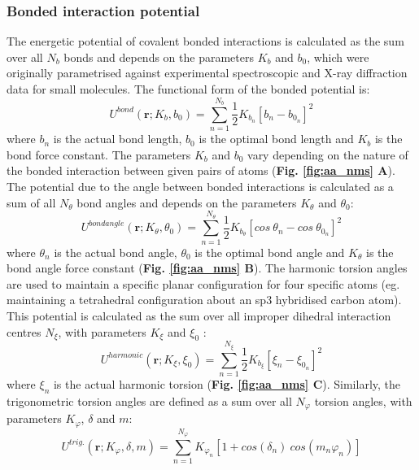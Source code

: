 \subsubsection{Bonded interaction potential}
The energetic potential of covalent bonded interactions is calculated as the sum over all $N_{b}$ bonds and depends on the parameters $K_{b}$ and $b_{0}$, which were originally parametrised against experimental spectroscopic and X-ray diffraction data for small molecules. The functional form of the bonded potential is:
%
%
\begin{equation}
U^{bond}(\mathbf{r}; K_{b}, b_{0}) = \sum_{n=1}^{N_{b}} \frac{1}{2} K_{b_{n}} \left[ b_{n} - b_{0_{n}} \right] ^{2}
\end{equation}
%
%
where $b_{n}$ is the actual bond length, $b_{0}$ is the optimal bond length and $K_{b}$ is the bond force constant. The parameters $K_{b}$ and $b_{0}$ vary depending on the nature of the bonded interaction between given pairs of atoms (\textbf{Fig. \ref{fig:aa_nms} A}). The potential due to the angle between bonded interactions is calculated as a sum of all $N_{\theta}$ bond angles and depends on the parameters $K_{\theta}$ and $\theta_{0}$:
%
%
\begin{equation}
U^{bond angle}(\mathbf{r}; K_{\theta},\theta_{0}) = \sum_{n=1}^{N_{\theta}} \frac{1}{2} K_{b_{\theta}} \left[ cos \: \theta_{n} - cos \: \theta_{0_{n}} \right] ^{2}
\end{equation}
%
%
where $\theta_{n}$ is the actual bond angle, $\theta_{0}$ is the optimal bond angle and $K_{\theta}$ is the bond angle force constant (\textbf{Fig. \ref{fig:aa_nms} B}). The harmonic torsion angles are used to maintain a specific planar configuration for four specific atoms (eg. maintaining a tetrahedral configuration about an sp3 hybridised carbon atom). This potential is calculated as the sum over all improper dihedral interaction centres $N_{\xi}$, with parameters $K_{\xi}$ and $\xi_{0}$ \cite{Oostenbrink:2004aa}:
%
%
\begin{equation}
U^{harmonic}(\mathbf{r}; K_{\xi}, \xi_{0}) = \sum_{n=1}^{N_{\xi}} \frac{1}{2} K_{b_{\xi}} \left[ \xi_{n} - \xi_{0_{n}} \right] ^{2}
\end{equation}
%
%
where $\xi_{n}$ is the actual harmonic torsion (\textbf{Fig. \ref{fig:aa_nms} C}). Similarly, the trigonometric torsion angles are defined as a sum over all $N_{\varphi}$ torsion angles, with parameters $K_{\varphi}$, $\delta$ and $m$:
%
%
\begin{equation}
U^{trig.}(\mathbf{r}; K_{\varphi}, \delta, m) = \sum_{n=1}^{N_{\varphi}} K_{\varphi_{n}} \left[ 1 + cos(\delta_{n}) \: cos(m_{n}\varphi_{n}) \right]
\end{equation}
